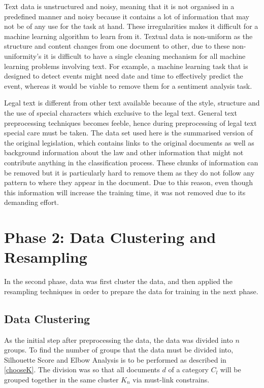 Text data is unstructured and noisy, meaning that it is not organised in a predefined manner and noisy because it contains a lot of information that may not be of any use for the task at hand. These irregularities makes it difficult for a machine learning algorithm to learn from it. Textual data is non-uniform as the structure and content changes from one document to other, due to these non-uniformity's it is difficult to have a single cleaning mechanism for all machine learning problems involving text. For example, a machine learning task that is designed to detect events might need date and time to effectively predict the event, whereas it would be viable to remove them for a sentiment analysis task.

Legal text is different from other text available because of the style, structure \cite{boella2011using} and the use of special characters which exclusive to the legal text. General text preprocessing techniques becomes feeble, hence during preprocessing of legal text special care must be taken. The data set used here is the summarised version of the original legislation, which contains links to the original documents as well as background information about the law and other information that might not contribute anything in the classification process. These chunks of information can be removed but it is particularly hard to remove them as they do not follow any pattern to where they appear in the document. Due to this reason, even though this information will increase the training time, it was not removed due to its demanding effort.

\section{Phase 2: Data Clustering and Resampling}
In the second phase, data was first cluster the data, and then applied the resampling techniques in order to prepare the data for training in the next phase.
\subsection*{Data Clustering}\label{concpeClustering}
As the initial step after preprocessing the data, the data was divided into $n$ groups. To find the number of groups that the data must be divided into, Silhouette Score and Elbow Analysis is to be performed  as described in \ref{chooseK}. The division was so that all documents $d$ of a category $C_{l}$ will be grouped together in the same cluster $K_{n}$ via must-link constrains.


